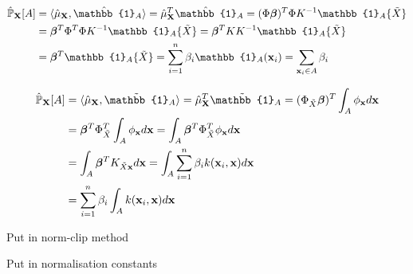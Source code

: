 \documentclass[twoside]{article} \usepackage{aistats2017}
\theoremstyle{definition}
\newcommand{\rv}[1]{{#1}}
\newcommand{\ds}[1]{\tilde{#1}}
\newcommand{\warn}[1]{{\color{red} #1}}
\begin{document}
		\begin{equation}
			\begin{aligned}
				\hat{\mathbb{P}}_{\bvec{\rv{X}}}[A] &= \langle \hat{\mu}_{\bvec{\rv{X}}}, \hat{\mathbb{1}}_{A} \rangle = \hat{\mu}_{\bvec{\rv{X}}}^{T}\hat{\mathbb{1}}_{A} = (\Phi \bm{\beta})^{T} \Phi K^{-1} \mathbb{1}_{A}\{\ds{X}\} \\
				&= \bm{\beta}^{T} \Phi^{T} \Phi K^{-1} \mathbb{1}_{A}\{\ds{X}\} = \bm{\beta}^{T} K K^{-1} \mathbb{1}_{A}\{\ds{X}\} \\
				&= \bm{\beta}^{T} \mathbb{1}_{A}\{\ds{X}\} = \sum_{i = 1}^{n} \beta_{i} \mathbb{1}_{A}(\bvec{x}_{i}) = \sum_{\bvec{x}_{i} \in A} \beta_{i}
			\end{aligned}
		\label{eq:empirical_distribution}
		\end{equation}
		
		\begin{equation}
			\begin{aligned}
				\hat{\mathbb{P}}_{\bvec{\rv{X}}}[A] &= \langle \hat{\mu}_{\bvec{\rv{X}}}, \tilde{\mathbb{1}}_{A} \rangle = \hat{\mu}_{\bvec{\rv{X}}}^{T} \tilde{\mathbb{1}}_{A} = (\Phi_{\ds{X}} \bm{\beta})^{T} \int_{A} \phi_{\bvec{x}} d\bvec{x} \\
				&= \bm{\beta}^{T} \Phi_{\ds{X}}^{T} \int_{A} \phi_{\bvec{x}} d\bvec{x} = \int_{A} \bm{\beta}^{T} \Phi_{\ds{X}}^{T} \phi_{\bvec{x}} d\bvec{x} \\
				&= \int_{A} \bm{\beta}^{T} K_{\ds{X} \bvec{x}} d\bvec{x} = \int_{A} \sum_{i = 1}^{n} \beta_{i} k(\bvec{x}_{i}, \bvec{x}) d\bvec{x} \\
				&= \sum_{i = 1}^{n} \beta_{i} \int_{A}  k(\bvec{x}_{i}, \bvec{x}) d\bvec{x} \\
			\end{aligned}
		\label{eq:smooth_empirical_distribution}
		\end{equation}
		
		\warn{Put in norm-clip method}
		
		\warn{Put in normalisation constants}
			
\end{document}
